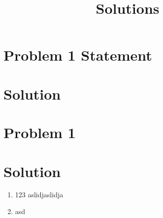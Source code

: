 \documentclass{article}
\begin{document}


\section*{Problem 1 Statement}

\section*{Solution}

\section*{Problem 1}

\section*{Solution}
\title{Solutions}
\begin{enumerate}
        \item 123
aslidjaslidja
        \item asd

\end{enumerate}
\end{document}
